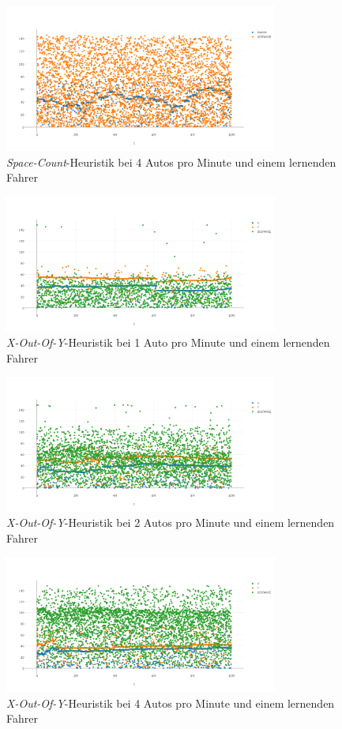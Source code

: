 \begin{figure}[H]
	\includegraphics[width=0.8\textwidth]{analyse/SingleMutant/spacecount4.png}
	\caption{\emph{Space-Count}-Heuristik bei 4 Autos pro Minute und einem lernenden Fahrer}\label{fig:ap_sm_sc_4}
\end{figure}
\begin{figure}[H]
	\includegraphics[width=0.8\textwidth]{analyse/SingleMutant/xy1.png}
	\caption{\emph{X-Out-Of-Y}-Heuristik bei 1 Auto pro Minute und einem lernenden Fahrer}\label{fig:ap_sm_xy_1}
\end{figure}
\begin{figure}[H]
	\includegraphics[width=0.8\textwidth]{analyse/SingleMutant/xy2.png}
	\caption{\emph{X-Out-Of-Y}-Heuristik bei 2 Autos pro Minute und einem lernenden Fahrer}\label{fig:ap_sm_xy_2}
\end{figure}
\begin{figure}[H]
	\includegraphics[width=0.8\textwidth]{analyse/SingleMutant/xy4.png}
	\caption{\emph{X-Out-Of-Y}-Heuristik bei 4 Autos pro Minute und einem lernenden Fahrer}\label{fig:ap_sm_xy_4}
\end{figure}

